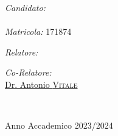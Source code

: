 \documentclass[
11pt, %
oneside, %
english, %
onehalfspacing,%
headsepline, %
]{BachelorThesis} %
\begin{document}
\begin{titlepage}
\begin{center}
			\begin{minipage}[t]{0.95\textwidth}
					\Large \emph{Candidato:} \\
					{\authorname}\\[0.1cm] %
					\emph{Matricola:} {171874} 
			\end{minipage}
			\begin{minipage}[t]{0.95\textwidth}
				\begin{flushright} \Large
					\emph{Relatore:}\\
					\href{https://dibt.unimol.it/staff/sscalabrino/home/}{\supname} %
					\begin{flushright} \Large
						\emph{Co-Relatore:}\\
						\href{https://scholar.google.com/citations?user=AdVTnyQAAAAJ&hl=it}{Dr. Antonio \textsc{Vitale}} %
					\end{flushright} 
				\end{flushright}
				
			\end{minipage}\\[1.5cm]
			
			\vfill
			
			\centerline{\Large Anno Accademico 2023/2024}
		\end{center}
	\end{titlepage}
	
\newpage

\newpage{}
\end{document}
